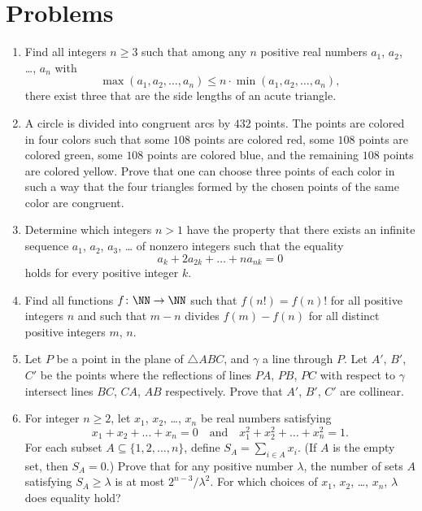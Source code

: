 \documentclass[11pt]{scrartcl}
\begin{document}
\section{Problems}
\begin{enumerate}[\bfseries 1.]
\item %
Find all integers $n \ge 3$ such that
among any $n$ positive real numbers
$a_1$, $a_2$, \dots, $a_n$ with
\[ \max(a_1,a_2,\dots,a_n)
  \le n \cdot \min(a_1,a_2,\dots,a_n), \]
there exist three that are the side lengths
of an acute triangle.

\item %
A circle is divided into congruent arcs by $432$ points.
The points are colored in four colors such that
some $108$ points are colored red,
some $108$ points are colored green,
some $108$ points are colored blue,
and the remaining $108$ points are colored yellow.
Prove that one can choose three points of each color in such a way
that the four triangles formed by the chosen points
of the same color are congruent.

\item %
Determine which integers $n > 1$ have the property
that there exists an infinite sequence $a_1$, $a_2$, $a_3$, \dots
of nonzero integers such that the equality
\[ a_k + 2a_{2k} + \dots + na_{nk} = 0 \]
holds for every positive integer $k$.

\item %
Find all functions $f \colon \NN \to \NN$ such that
$f(n!) = f(n)!$ for all positive integers $n$ and such that
$m-n$ divides $f(m) - f(n)$ for all distinct positive integers $m$, $n$.

\item %
Let $P$ be a point in the plane of $\triangle ABC$,
and $\gamma$ a line through $P$.
Let $A'$, $B'$, $C'$ be the points where the
reflections of lines $PA$, $PB$, $PC$ with respect to $\gamma$
intersect lines $BC$, $CA$, $AB$ respectively.
Prove that $A'$, $B'$, $C'$ are collinear.

\item %
For integer $n \ge 2$,
let $x_1$, $x_2$, \dots, $x_n$ be real numbers satisfying
\[ x_1 + x_2 +  \dots + x_n = 0
  \quad\text{and}\quad x_1^2 + x_2^2 + \dots + x_n^2 = 1. \]
For each subset $A\subseteq\{1, 2, \dots, n\}$, define $S_A=\sum_{i\in A} x_i$.
(If $A$ is the empty set, then $S_A=0$.)
Prove that for any positive number $\lambda$,
the number of sets $A$ satisfying $S_A\geq\lambda$ is at most $2^{n-3}/\lambda^2$.
For which choices of $x_1$, $x_2$, \dots, $x_n$, $\lambda$ does equality hold?

\end{enumerate}
\pagebreak
\end{document}

